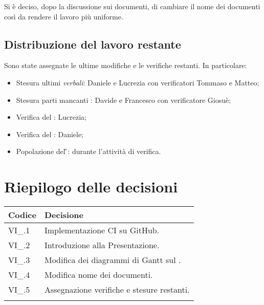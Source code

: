 Si è deciso, dopo la discussione sui documenti, di cambiare il nome dei documenti così da rendere il lavoro più uniforme.

\subsection{Distribuzione del lavoro restante}

Sono state assegnate le ultime modifiche e le verifiche restanti. In particolare:
\begin{itemize}

\item Stesura ultimi \textit{verbali}: Daniele e Lucrezia con verificatori Tommaso e Matteo;

\item Stesura parti mancanti \NdP{}: Davide e Francesco con verificatore Giosuè;

\item Verifica del \PdP{}: Lucrezia;

\item Verifica del \PdQ{}: Daniele;

\item Popolazione del \G{}: durante l'attività di verifica.



\end{itemize}


\newpage

\section{Riepilogo delle decisioni \hfil}
{
	\setlength{\freewidth}{\dimexpr\textwidth-4\tabcolsep}
	\renewcommand{\arraystretch}{1.5}
	\setlength{\aboverulesep}{0pt}
	\setlength{\belowrulesep}{0pt}
	\begin{longtable}{L{.3\freewidth} L{.7\freewidth}}
		\toprule 
		\textbf{Codice} & \textbf{Decisione}\\
		\toprule
		\endhead
		
		VI\_\DataMeeting{}.1 & Implementazione CI su GitHub. \\
		VI\_\DataMeeting{}.2 & Introduzione alla Presentazione. \\
		VI\_\DataMeeting{}.3 & Modifica dei diagrammi di Gantt sul \PdP{}. \\
		VI\_\DataMeeting{}.4 & Modifica nome dei documenti. \\
		VI\_\DataMeeting{}.5 & Assegnazione verifiche e stesure restanti. \\
		
		\bottomrule
		\hiderowcolors
	\end{longtable}
}